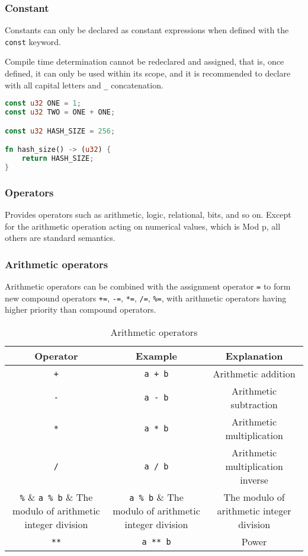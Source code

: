 \subsubsection{Constant}

Constants can only be declared as constant expressions when defined with the \texttt{const} keyword.

Compile time determination cannot be redeclared and assigned, that is, once defined, it can only be used within its scope, and it is recommended to declare with all capital letters and \texttt{\_} concatenation. 

\begin{lstlisting}[language=rust]
const u32 ONE = 1;
const u32 TWO = ONE + ONE;

const u32 HASH_SIZE = 256;

fn hash_size() -> (u32) {
    return HASH_SIZE;
}
\end{lstlisting}

\subsubsection{Operators}

Provides operators such as arithmetic, logic, relational, bits, and so on. Except for the arithmetic operation acting on numerical values, which is Mod p, all others are standard semantics. 

\subsubsection*{Arithmetic operators}

Arithmetic operators can be combined with the assignment operator \verb|=| to form new compound operators \verb|+=|, \verb|-=|, \verb|*=|, \verb|/=|, \verb|%=|, with arithmetic operators having higher priority than compound operators. 

\begin{table}
\centering
\begin{tabular}{c|c|c}
    Operator & Example & Explanation \\ \hline
    \verb|+| & \verb|a + b| & Arithmetic addition \\
    \verb|-| & \verb|a - b| & Arithmetic subtraction \\
    \verb|*| & \verb|a * b| & Arithmetic multiplication  \\
    \verb|/| & \verb|a / b| & Arithmetic multiplication inverse \\
    \verb|%| & \verb|a % b| & The modulo of arithmetic integer division \\
    \verb|**| & \verb|a ** b| & Power \\
\end{tabular}
\caption{Arithmetic operators}
\end{table}


